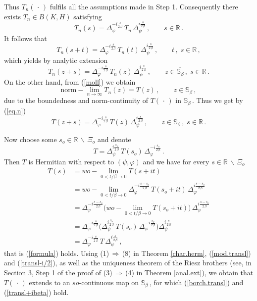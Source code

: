 \documentclass[reqno]{amsart}
\theoremstyle{definition}
\theoremstyle{remark}
\numberwithin{equation}{section}
\theoremstyle{plain}
\begin{document}
Thus $T_n(\,\cdot\, )$ fulfils all the assumptions made in Step 1.
Consequently there exists $T_n\in B(K,H)$ satisfying
\begin{equation*}
T_n(s)=\Delta_\varphi^{-i \frac s{2\,\beta}}\, T_n\,
\Delta_\psi^{i \frac s{2\,\beta}}\, ,\qquad s\in\mathbb R\, .
\end{equation*}
It follows that
\begin{equation*}
T_n(s+t)=\Delta_\varphi^{-i \frac s{2\,\beta}}\, T_n(t)\,
\Delta_\psi^{i \frac s{2\,\beta}}\, ,\qquad t\, ,\; s\in\mathbb R\, ,
\end{equation*}
which yields by analytic extension
\begin{equation}\label{eq.n}
T_n(z+s)=\Delta_\varphi^{-i \frac s{2\,\beta}}\, T_n(z)\,
\Delta_\psi^{i \frac s{2\,\beta}}\, ,\qquad z\in
\overline{\mathbb S_\beta}\, ,\; s\in\mathbb R\, .
\end{equation}
On the other hand, from (\ref{moll}) we obtain
\begin{equation*}
\text{norm}-\lim_{n\to\infty} T_n(z)=T(z)\, ,\qquad z\in
\mathbb S_\beta\, ,
\end{equation*}
due to the boundedness and norm-continuity of $T(\,\cdot\, )$ in
$\mathbb S_\beta\,$. Thus we get by (\ref{eq.n})
\begin{equation*}
T(z+s)=\Delta_\varphi^{-i \frac s{2\,\beta}}\, T(z)\,
\Delta_\psi^{i \frac s{2\,\beta}}\, ,\qquad z\in\mathbb S_\beta\,
,\; s\in\mathbb R\, .
\end{equation*}

Now choose some $s_o\in\mathbb R\,\backslash\,\Xi_o$ and denote
\begin{equation*}
T=\Delta_\psi^{i \frac {s_o}{2\,\beta}}\, T(s_o)\,
\Delta_\varphi^{-i \frac {s_o}{2\,\beta}}\, .
\end{equation*}
Then $T$ is Hermitian with respect to $(\psi ,\varphi )$ and we have
for every $s\in\mathbb R\,\backslash\,\Xi_o$
\begin{align*}
T(s) &=wo - \lim_{0<t/\beta \to 0} T(s+it) \\
&=wo - \lim_{0<t/\beta \to 0}
\Delta_\varphi^{-i \frac {s-s_o}{2\,\beta}}\, T(s_o+it)\,
\Delta_\varphi^{i \frac {s-s_o}{2\,\beta}} \\
&=\Delta_\varphi^{-i \frac {s-s_o}{2\,\beta}} \Big(
wo - \lim_{0<t/\beta \to 0} T(s_o+it) \Big)\,
\Delta_\varphi^{i \frac {s-s_o}{2\,\beta}} \\
&=\Delta_\varphi^{-i \frac s{2\,\beta}} \Big(
\Delta_\psi^{i \frac {s_o}{2\,\beta}}\, T(s_o)\,
\Delta_\varphi^{-i \frac {s_o}{2\,\beta}} \Big)
\Delta_\psi^{i \frac s{2\,\beta}} \\
&=\Delta_\varphi^{-i \frac s{2\,\beta}}\, T\,
\Delta_\psi^{i \frac s{2\,\beta}}\, ,
\end{align*}
that is (\ref{formula}) holds. Using (1)$\,\Rightarrow\,$(8) in
Theorem \ref{char.herm}, (\ref{mod.transl}) and (\ref{transl-i/2}),
as well as the uniqueness theorem of the Riesz brothers (see, in
Section 3, Step 1 of the proof of (3)$\,\Rightarrow\,$(4) in Theorem
\ref{anal.ext}), we obtain that $T(\,\cdot\, )$ extends to an
$so$-continuous map on $\mathbb S_\beta\,$, for which
(\ref{borch.transl}) and (\ref{transl+ibeta}) hold.
\end{document}
